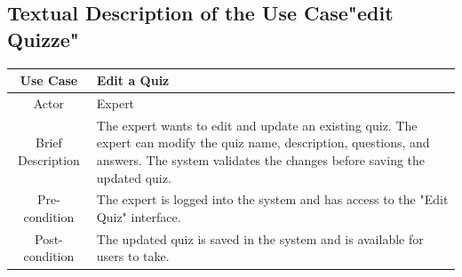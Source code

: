 \subsection{Textual Description of the Use Case"edit Quizze"}
\begin{table}[h]
\centering
    \begin{tabular}{|c|p{12cm}|}
        \hline
        Use Case & Edit a Quiz \\
        \hline
        Actor & Expert  \\
        \hline
        Brief Description & The expert wants to edit and update an existing quiz. The expert can modify the quiz name, description, questions, and answers. The system validates the changes before saving the updated quiz. \\
        \hline
        Pre-condition & The expert is logged into the system and has access to the "Edit Quiz" interface. \\
        \hline
        Post-condition & The updated quiz is saved in the system and is available for users to take. \\
        \hline  \end{tabular}\end{table}
